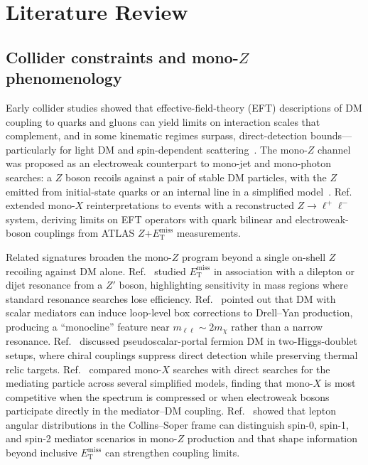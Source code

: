 \documentclass[11pt,a4paper,twocolumn]{article}
\newcommand{\MET}{\ensuremath{E_{\mathrm{T}}^{\mathrm{miss}}}}
\begin{document}
\section{Literature Review}
\label{sec:literature}

\subsection{Collider constraints and mono-\texorpdfstring{$Z$}{Z} phenomenology}
\label{sec:lit-pheno}

Early collider studies showed that effective-field-theory (EFT) descriptions of DM
coupling to quarks and gluons can yield limits on interaction scales that complement,
and in some kinematic regimes surpass, direct-detection bounds---particularly for light
DM and spin-dependent scattering~\cite{Goodman2011}.
The mono-$Z$ channel was proposed as an electroweak counterpart to mono-jet and
mono-photon searches: a $Z$ boson recoils against a pair of stable DM particles, with
the $Z$ emitted from initial-state quarks or an internal line in a simplified
model~\cite{Bell2012}.
Ref.~\cite{Carpenter2013} extended mono-$X$ reinterpretations to events with a
reconstructed $Z\to\ell^+\ell^-$ system, deriving limits on EFT operators with quark
bilinear and electroweak-boson couplings from ATLAS $Z$+$\MET$ measurements.

Related signatures broaden the mono-$Z$ program beyond a single on-shell $Z$ recoiling
against DM alone.
Ref.~\cite{Autran2015} studied $\MET$ in association with a dilepton or dijet resonance
from a $Z'$ boson, highlighting sensitivity in mass regions where standard resonance
searches lose efficiency.
Ref.~\cite{Altmannshofer2015} pointed out that DM with scalar mediators can induce
loop-level box corrections to Drell--Yan production, producing a ``monocline'' feature
near $m_{\ell\ell}\sim 2m_\chi$ rather than a narrow resonance.
Ref.~\cite{Berlin2015} discussed pseudoscalar-portal fermion DM in two-Higgs-doublet
setups, where chiral couplings suppress direct detection while preserving thermal relic
targets.
Ref.~\cite{Liew2017} compared mono-$X$ searches with direct searches for the mediating
particle across several simplified models, finding that mono-$X$ is most competitive
when the spectrum is compressed or when electroweak bosons participate directly in the
mediator--DM coupling.
Ref.~\cite{Yang2017} showed that lepton angular distributions in the Collins--Soper frame
can distinguish spin-0, spin-1, and spin-2 mediator scenarios in mono-$Z$ production and
that shape information beyond inclusive $\MET$ can strengthen coupling limits.
\end{document}
